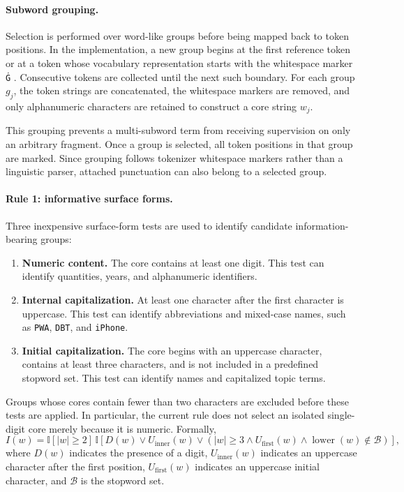 \documentclass{article} %
\begin{document}
\paragraph{Subword grouping.}
Selection is performed over word-like groups before being mapped back to token positions. In the implementation, a new group begins at the first reference token or at a token whose vocabulary representation starts with the whitespace marker \texttt{Ġ} . Consecutive tokens are collected until the next such boundary. For each group $g_j$, the token strings are concatenated, the whitespace markers are removed, and only alphanumeric characters are retained to construct a core string $w_j$.

This grouping prevents a multi-subword term from receiving supervision on only an arbitrary fragment. Once a group is selected, all token positions in that group are marked. Since grouping follows tokenizer whitespace markers rather than a linguistic parser, attached punctuation can also belong to a selected group.

\paragraph{Rule 1: informative surface forms.}
Three inexpensive surface-form tests are used to identify candidate information-bearing groups:
\begin{enumerate}
    \item \textbf{Numeric content.} The core contains at least one digit. This test can identify quantities, years, and alphanumeric identifiers.
    \item \textbf{Internal capitalization.} At least one character after the first character is uppercase. This test can identify abbreviations and mixed-case names, such as \texttt{PWA}, \texttt{DBT}, and \texttt{iPhone}.
    \item \textbf{Initial capitalization.} The core begins with an uppercase character, contains at least three characters, and is not included in a predefined stopword set. This test can identify names and capitalized topic terms.
\end{enumerate}

Groups whose cores contain fewer than two characters are excluded before these tests are applied. In particular, the current rule does not select an isolated single-digit core merely because it is numeric. Formally,
\begin{equation}
I(w)=
\mathbb{I}[|w|\geq 2]\,
\mathbb{I}\!\left[
D(w)\lor U_{\mathrm{inner}}(w)
\lor
\left(
|w|\geq 3
\land U_{\mathrm{first}}(w)
\land \operatorname{lower}(w)\notin\mathcal{B}
\right)
\right],
\label{eq:focal_informative}
\end{equation}
where $D(w)$ indicates the presence of a digit, $U_{\mathrm{inner}}(w)$ indicates an uppercase character after the first position, $U_{\mathrm{first}}(w)$ indicates an uppercase initial character, and $\mathcal{B}$ is the stopword set.
\end{document}
